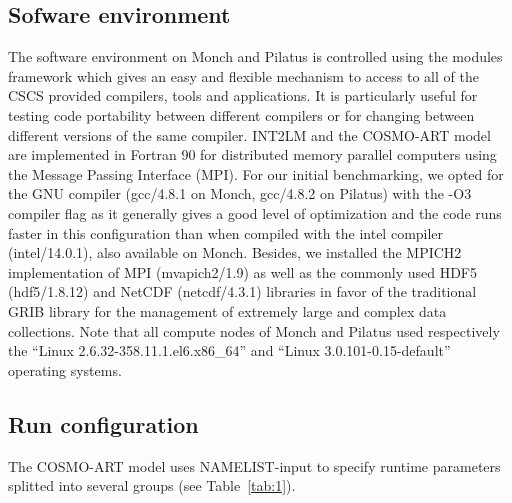 \subsection{Sofware environment}
\label{subsec:3.1}
The software environment on Monch  and Pilatus is controlled using the
modules framework which gives an easy and flexible mechanism to access
to all of the CSCS  provided compilers, tools and applications.  It is
particularly  useful for  testing code  portability  between different
compilers  or for  changing  between different  versions  of the  same
compiler.  INT2LM  and the COSMO-ART model are  implemented in Fortran
90 for distributed memory parallel computers using the Message Passing
Interface (MPI).  For  our initial benchmarking, we opted  for the GNU
compiler  (gcc/4.8.1 on  Monch,  gcc/4.8.2 on  Pilatus)  with the  -O3
compiler flag as  it generally gives a good  level of optimization and
the code runs faster in this configuration than when compiled with the
intel compiler  (intel/14.0.1), also available on  Monch.  Besides, we
installed the  MPICH2 implementation of MPI (mvapich2/1.9)  as well as
the  commonly  used   HDF5  (hdf5/1.8.12)  and  NetCDF  (netcdf/4.3.1)
libraries in favor of the  traditional GRIB library for the management
of  extremely  large and  complex  data  collections.   Note that  all
compute  nodes of  Monch  and Pilatus  used  respectively the  ``Linux
2.6.32-358.11.1.el6.x86\_64''   and   ``Linux   3.0.101-0.15-default''
operating systems.

\subsection{Run configuration}
\label{subsec:3.2}
The COSMO-ART model uses NAMELIST-input to specify runtime parameters
splitted into several groups (see Table~\ref{tab:1}). 

